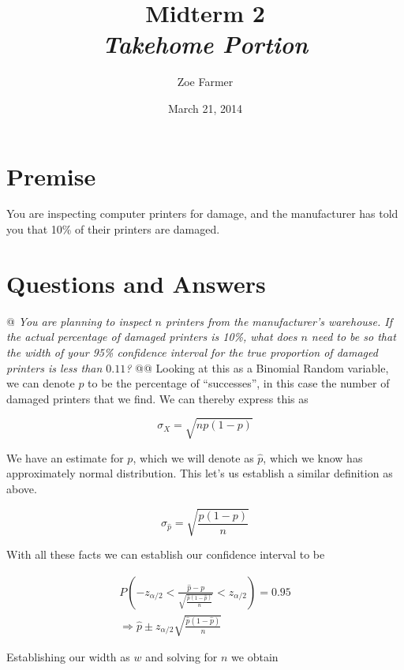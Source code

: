 \documentclass[10pt]{report}\usepackage[]{graphicx}\usepackage[]{xcolor}
\title{Midterm 2\\\textit{Takehome Portion} }
\author{Zoe Farmer}
\date{March 21, 2014}
\begin{document}
\maketitle

\section{Premise}
You are inspecting computer printers for damage, and the manufacturer has told you that 10\% of their printers are
damaged.\newline


\section{Questions and Answers}
    \begin{easylist}[enumerate]
        @ \textit{You are planning to inspect $n$ printers from the manufacturer's warehouse. If the actual percentage
        of damaged printers is 10\%, what does $n$ need to be so that the width of your 95\% confidence interval for the
        true proportion of damaged printers is less than $0.11$?}
        @@ Looking at this as a Binomial Random variable, we can denote $p$ to be the percentage of ``successes'', in this
        case the number of damaged printers that we find. We can thereby express this as

        \[
            \sigma_X = \sqrt{np (1 - p)}
        \]

        We have an estimate for $p$, which we will denote as $\hat{p}$, which we know has approximately normal
        distribution. This let's us establish a similar definition as above.

        \[
            \sigma_{\hat{p} } = \sqrt{\frac{p(1-p)}{n} }
        \]

        With all these facts we can establish our confidence interval to be

        \[
            \begin{aligned}
                P \left( -z_{\alpha/2} <
                    \frac{\hat{p} - p}{\sqrt{\frac{\hat{p}\left(1-\hat{p}\right)}{n} } } <
                    z_{\alpha/2} \right) = 0.95\\
                \Rightarrow \hat{p} \pm z_{\alpha/2} \sqrt{\frac{\hat{p} (1 - \hat{p})}{n} }
            \end{aligned}
        \]

        Establishing our width as $w$ and solving for $n$ we obtain


\end{easylist}
\end{document}
